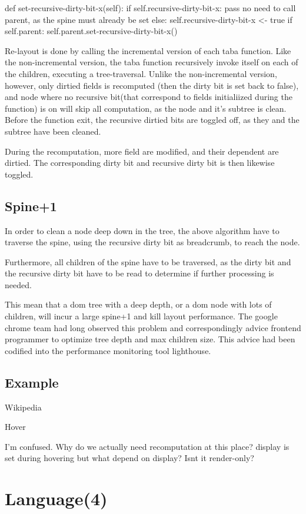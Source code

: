 \documentclass[format=acmsmall, review=false, screen=true]{acmart}
\begin{document}
def set-recursive-dirty-bit-x(self):
  if self.recursive-dirty-bit-x:
    pass no need to call parent, as the spine must already be set
  else:
    self.recursive-dirty-bit-x <- true
    if self.parent:
      self.parent.set-recursive-dirty-bit-x()

Re-layout is done by calling the incremental version of each taba function. Like the non-incremental version, the taba function recursively invoke itself on each of the children, executing a tree-traversal. Unlike the non-incremental version, however, only dirtied fields is recomputed (then the dirty bit is set back to false), and node where no recursive bit(that correspond to fields initialiized during the function) is on will skip all computation, as the node and it's subtree is clean. Before the function exit, the recursive dirtied bits are toggled off, as they and the subtree have been cleaned.

During the recomputation, more field are modified, and their dependent are dirtied. The corresponding dirty bit and recursive dirty bit is then likewise toggled.
\subsection{Spine+1}
In order to clean a node deep down in the tree, the above algorithm have to traverse the spine, using the recursive dirty bit as breadcrumb, to reach the node.

Furthermore, all children of the spine have to be traversed, as the dirty bit and the recursive dirty bit have to be read to determine if further processing is needed.

This mean that a dom tree with a deep depth, or a dom node with lots of children, will incur a large spine+1 and kill layout performance. The google chrome team had long observed this problem and correspondingly advice frontend programmer to optimize tree depth and max children size. This advice had been codified into the performance monitoring tool lighthouse.

\subsection{Example}
Wikipedia

Hover

I'm confused. Why do we actually need recomputation at this place? display is set during hovering but what depend on display? Isnt it render-only?

\section{Language(4)}
\end{document}
